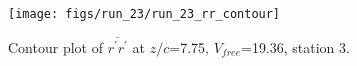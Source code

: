 \begin{figure}[H]
\centering
\texttt{[image: figs/run\_23/run\_23\_rr\_contour]}
\caption{Contour plot of $\overline{r^\prime r^\prime}$ at $z/c$=7.75, $V_{free}$=19.36, station 3.}
\label{fig:run_23_rr_contour}
\end{figure}


